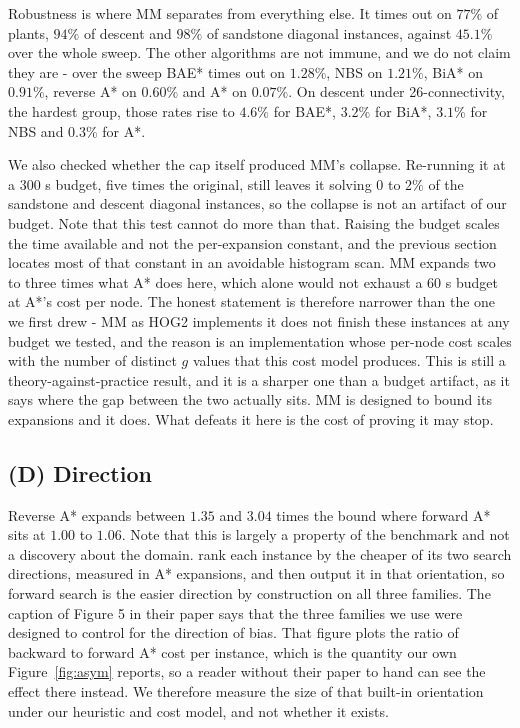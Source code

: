 \documentclass[letterpaper]{article} %
\begin{document}
Robustness is where MM separates from everything else. It times out on $77\%$ of plants, $94\%$ of descent and $98\%$ of sandstone diagonal instances, against $45.1\%$ over the whole sweep. The other algorithms are not immune, and we do not claim they are - over the sweep BAE* times out on $1.28\%$, NBS on $1.21\%$, BiA* on $0.91\%$, reverse A* on $0.60\%$ and A* on $0.07\%$. On descent under 26-connectivity, the hardest group, those rates rise to $4.6\%$ for BAE*, $3.2\%$ for BiA*, $3.1\%$ for NBS and $0.3\%$ for A*.

We also checked whether the cap itself produced MM's collapse. Re-running it at a $300$ s budget, five times the original, still leaves it solving $0$ to $2\%$ of the sandstone and descent diagonal instances, so the collapse is not an artifact of our budget. Note that this test cannot do more than that. Raising the budget scales the time available and not the per-expansion constant, and the previous section locates most of that constant in an avoidable histogram scan. MM expands two to three times what A* does here, which alone would not exhaust a $60$ s budget at A*'s cost per node. The honest statement is therefore narrower than the one we first drew - MM as HOG2 implements it does not finish these instances at any budget we tested, and the reason is an implementation whose per-node cost scales with the number of distinct $g$ values that this cost model produces. This is still a theory-against-practice result, and it is a sharper one than a budget artifact, as it says where the gap between the two actually sits. MM is designed to bound its expansions and it does. What defeats it here is the cost of proving it may stop.

\subsection{(D) Direction}
Reverse A* expands between $1.35$ and $3.04$ times the bound where forward A* sits at $1.00$ to $1.06$. Note that this is largely a property of the benchmark and not a discovery about the domain. \citet{nobes2023voxel} rank each instance by the cheaper of its two search directions, measured in A* expansions, and then output it in that orientation, so forward search is the easier direction by construction on all three families. The caption of Figure 5 in their paper says that the three families we use were designed to control for the direction of bias. That figure plots the ratio of backward to forward A* cost per instance, which is the quantity our own Figure~\ref{fig:asym} reports, so a reader without their paper to hand can see the effect there instead. We therefore measure the size of that built-in orientation under our heuristic and cost model, and not whether it exists.
\end{document}
